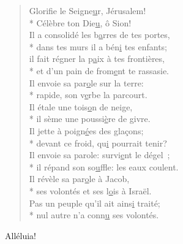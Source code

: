\begin{verse}
Glorifie le Seigne\underline{u}r, Jérusalem! \\*
Célèbre ton Die\underline{u}, ô Sion! \\

Il a consolidé les b\underline{a}rres de tes portes, \\*
dans tes murs il a bén\underline{i} tes enfants; \\
il fait régner la p\underline{a}ix à tes frontières, \\*
et d’un pain de from\underline{e}nt te rassasie. \\

Il envoie sa par\underline{o}le sur la terre: \\*
rapide, son v\underline{e}rbe la parcourt. \\
Il étale une tois\underline{o}n de neige, \\*
il sème une poussi\underline{è}re de givre. \\

Il jette à poign\underline{é}es des glaçons; \\*
devant ce froid, qu\underline{i} pourrait tenir? \\
Il envoie sa parole: survi\underline{e}nt le dégel ; \\*
il répand son so\underline{u}ffle: les eaux coulent. \\

Il révèle sa par\underline{o}le à Jacob, \\*
ses volontés et ses l\underline{o}is à Israël. \\
Pas un peuple qu’il ait ains\underline{i} traité; \\*
nul autre n’a conn\underline{u} ses volontés. \\
\end{verse}

Alléluia! \\

